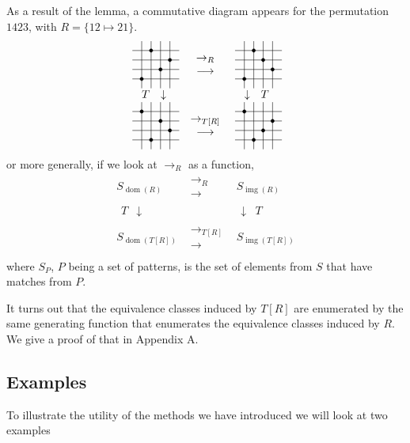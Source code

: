 \documentclass[a4paper, 11pt, english]{article}
\newcommand{\pattern}[4]{
  \raisebox{0.6ex}{
  \begin{tikzpicture}[scale=0.3, baseline=(current bounding box.center), #1]
    \foreach \x/\y in {#4}
      \fill[NE-lines] (\x,\y) rectangle +(1,1);
    \draw (0.01,0.01) grid (#2+0.99,#2+0.99);
    \foreach \x/\y in {#3}
      \filldraw (\x,\y) circle (5pt);
  \end{tikzpicture}}
}
\newcommand{\patternrule}{ \mapsto \!}
\theoremstyle{definition}
\newcommand{\Sym}{S}
\DeclareMathOperator{\dom}{dom}
\DeclareMathOperator{\img}{img}
\begin{document}
As a result of the lemma, a commutative diagram appears for the permutation $1423$,
with $R=\{12 \patternrule 21 \}$.
\[
  \begin{matrix}
    \pattern{}{4}{1/1, 2/4, 3/2, 4/3}{} & \begin{matrix} \to_R \\ \longrightarrow \end{matrix} & \pattern{}{4}{1/1, 2/4, 3/3, 4/2}{} \\
    \begin{matrix}T & \downarrow\end{matrix} & & \begin{matrix} \downarrow & T \end{matrix} \\
    \pattern{}{4}{1/4, 2/1, 3/3, 4/2}{} & \begin{matrix} \to_{T[R]} \\ \longrightarrow \end{matrix} & \pattern{}{4}{1/4, 2/1, 3/2, 4/3}{} \\
  \end{matrix}
\]
or more generally, if we look at $\to_R$ as a function,
\[
  \begin{matrix}
    \Sym_{\dom(R)} & \begin{matrix} \to_R \\ \longrightarrow \end{matrix} & \Sym_{\img(R)} \\
    \begin{matrix}T & \downarrow\end{matrix} & & \begin{matrix} \downarrow & T \end{matrix} \\
    \Sym_{\dom(T[R])} & \begin{matrix} \to_{T[R]} \\ \longrightarrow \end{matrix} & \Sym_{\img(T[R])} \\
  \end{matrix}
\]
where $\Sym_P$, $P$ being a set of patterns, is the set of elements from $\Sym$ that have matches from $P$.

It turns out that the equivalence classes induced by $T[R]$ are enumerated by
the same generating function that enumerates the equivalence classes induced by
$R$. We give a proof of that in Appendix A.

\subsection{Examples}
To illustrate the utility of the methods we have introduced we will look at two
examples
\end{document}
